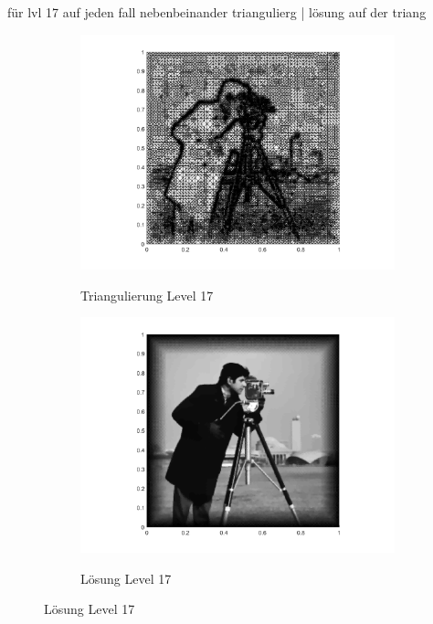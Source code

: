 für lvl 17 auf jeden fall nebenbeinander triangulierg | lösung auf der triang

\begin{figure}[p]
  \centering
  \begin{subfigure}[b]{.48\linewidth}
    \centering
    \caption{Triangulierung Level 17}
    \includegraphics[trim = 100 30 80 20, clip, width=\linewidth]
      {pictures/chapExperiments/secGrayscale/cam/adaptive/lvl17/triangulation.png}
    \label{fig:camLvl17Triang}
  \end{subfigure}
  \quad
  \begin{subfigure}[b]{.48\linewidth}
    \centering
    \caption{Lösung Level 17}
    \includegraphics[trim = 100 30 80 20, clip, width=\linewidth]
      {pictures/chapExperiments/secGrayscale/cam/adaptive/lvl17/solutionGrayscale.png}
    \label{fig:camLvl17Sol}
  \end{subfigure}


\end{figure}
